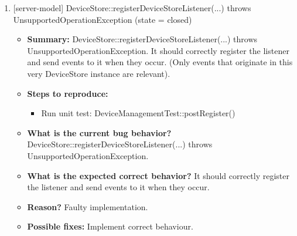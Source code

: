 \begin{enumerate}
\item {[server-model] DeviceStore::registerDeviceStoreListener(...) throws UnsupportedOperationException (state = closed)}
\begin{itemize}	
	\item \textbf{Summary: }DeviceStore::registerDeviceStoreListener(...) throws UnsupportedOperationException. It should correctly register the listener and send events to it when they occur. (Only events that originate in this very DeviceStore instance are relevant).\\
	\item \textbf{Steps to reproduce: }
	\begin{itemize}
		\item Run unit test: DeviceManagementTest::postRegister()\\
	\end{itemize}
	\item \textbf{What is the current bug behavior? }DeviceStore::registerDeviceStoreListener(...) throws UnsupportedOperationException.\\
	\item \textbf{What is the expected correct behavior? }It should correctly register the listener and send events to it when they occur.\\
	\item \textbf{Reason? }Faulty implementation.\\
	\item \textbf{Possible fixes: }Implement correct behaviour.\\
\end{itemize}



\end{enumerate}
